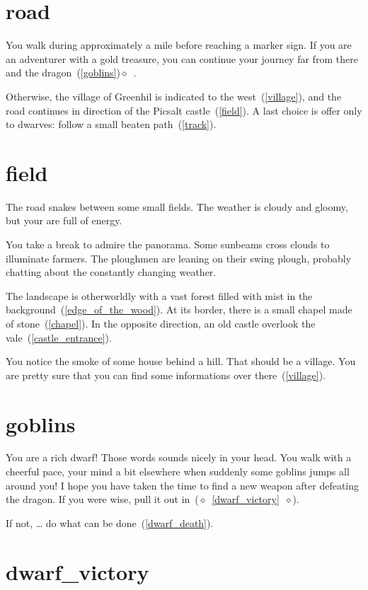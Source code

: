 \section{road}

You walk during approximately a mile before reaching a marker sign. If you are
an adventurer with a gold treasure, you can continue your journey far from there and
the dragon~(\ref{goblins})$\diamond$~.

Otherwise, the village of Greenhil is indicated to the west~(\ref{village}), and
the road continues in direction of the Picsalt castle~(\ref{field}). A last
choice is offer only to dwarves: follow a small beaten path~(\ref{track}).

\section{field}

The road snakes between some small fields. The weather is cloudy and gloomy, but
your are full of energy.

You take a break to admire the panorama. Some sunbeams cross clouds to
illuminate farmers. The ploughmen are leaning on their swing plough, probably
chatting about the constantly changing weather.

The landscape is otherworldly with a vast forest filled with mist in the
background~(\ref{edge_of_the_wood}). At its border, there is a small chapel made
of stone~(\ref{chapel}). In the opposite direction, an old castle overlook the
vale~(\ref{castle_entrance}).

You notice the smoke of some house behind a hill. That should be a village. You
are pretty sure that you can find some informations over there~(\ref{village}).


\section{goblins}

You are a rich dwarf! Those words sounds nicely in your head. You walk with a
cheerful pace, your mind a bit elsewhere when suddenly some goblins jumps all
around you! I hope you have taken the time to find a new weapon after defeating
the dragon. If you were wise, pull it out
in~($\diamond$~\ref{dwarf_victory}~$\diamond$).

If not, … do what can be done~(\ref{dwarf_death}).

\section{dwarf_victory}

